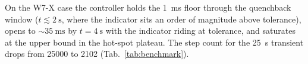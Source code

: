 \documentclass[11pt,a4paper]{article}
\begin{document}
On the W7-X case the controller holds the \SI{1}{\milli\second} floor through
the quenchback window ($t \lesssim \SI{2}{\second}$, where the indicator sits an
order of magnitude above tolerance), opens to $\sim\SI{35}{\milli\second}$ by
$t = \SI{4}{\second}$ with the indicator riding at tolerance, and saturates at
the upper bound in the hot-spot plateau. The step count for the
\SI{25}{\second} transient drops from \num{25000} to \num{2102}
(Tab.~\ref{tab:benchmark}).
\end{document}
